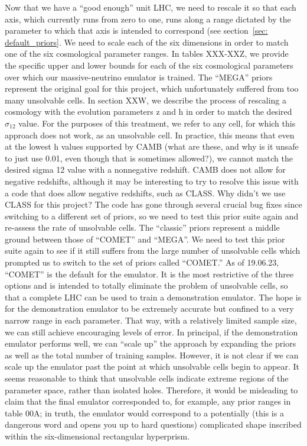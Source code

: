 Now that we have a ``good enough'' unit LHC, we need to rescale it so that
each axis, which currently runs from zero to one, runs along a range dictated
by the parameter to which that axis is intended to correspond (see
section~\ref{sec: default_priors}. We need to scale each of the six dimensions in order to match one of the six cosmological parameter ranges. In tables XXX-XXZ, we provide the specific upper and lower bounds for each of the six cosmological parameters over which our massive-neutrino emulator is trained. The ``MEGA'' priors represent the original goal for this project, which unfortunately suffered from too many unsolvable cells. In section XXW, we describe the process of rescaling a cosmology with the evolution parameters z and h in order to match the desired $\sigma_{12}$ value. For the purposes of this treatment, we refer to any cell, for which this approach does not work, as an unsolvable cell. In practice, this means that even at the lowest h values supported by CAMB (what are these, and why is it unsafe to just use 0.01, even though that is sometimes allowed?), we cannot match the desired sigma 12 value with a nonnegative redshift. CAMB does not allow for negative redshifts, although it may be interesting to try to resolve this issue with a code that does allow negative redshifts, such as CLASS. Why didn’t we use CLASS for this project? The code has gone through several crucial bug fixes since switching to a different set of priors, so we need to test this prior suite again and re-assess the rate of unsolvable cells. The ``classic'' priors represent a middle ground between those of ``COMET'' and ``MEGA''. We need to test this prior suite again to see if it still suffers from the large number of unsolvable cells which prompted us to switch to the set of priors called ``COMET.'' As of 19.06.23, ``COMET'' is the default for the emulator. It is the most restrictive of the three options and is intended to totally eliminate the problem of unsolvable cells, so that a complete LHC can be used to train a demonstration emulator. The hope is for the demonstration emulator to be extremely accurate but confined to a very narrow range in each parameter. That way, with a relatively limited sample size, we can still achieve encouraging levels of error. In principal, if the demonstration emulator performs well, we can ``scale up'' the approach by expanding the priors as well as the total number of training samples. However, it is not clear if we can scale up the emulator past the point at which unsolvable cells begin to appear. It seems reasonable to think that unsolvable cells indicate extreme regions of the parameter space, rather than isolated holes. Therefore, it would be misleading to claim that the final emulator corresponded to, for example, any prior ranges in table 00A; in truth, the emulator would correspond to a potentially (this is a dangerous word and opens you up to hard questions) complicated shape inscribed within the six-dimensional rectangular hyperprism.

